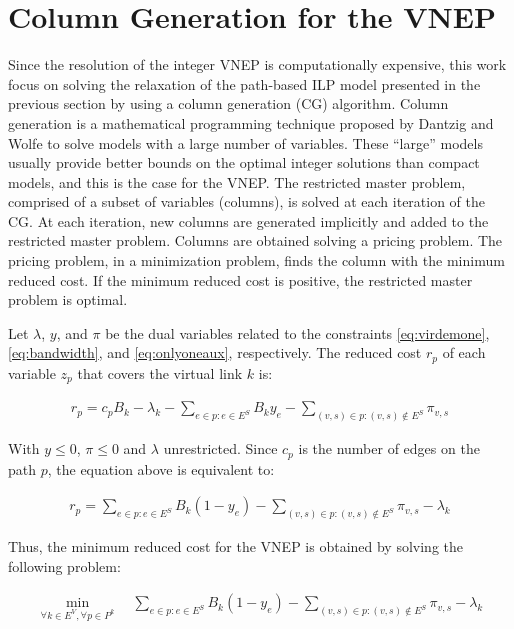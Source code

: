 \documentclass[article]{llncs}
\begin{document}
\section{Column Generation for the VNEP}
\label{sec:CG}

Since the resolution of the integer VNEP is computationally expensive, 
this work focus on solving the relaxation of the path-based ILP model presented in the previous section by using a column generation (CG) algorithm.
Column generation is a mathematical programming technique proposed by Dantzig and Wolfe \cite{Dantzig:1960} 
to solve models with a large number of variables.
These ``large'' models usually provide better bounds on the optimal integer solutions than compact models, and this is the case for the VNEP.
The restricted master problem, comprised of a subset of variables (columns), is solved at each iteration of the CG.
At each iteration, new columns are generated implicitly and added to the restricted master problem.
Columns are obtained solving a pricing problem.
The pricing problem, in a minimization problem, finds the column with the minimum reduced cost.
If the minimum reduced cost is positive, the restricted master problem is optimal.

Let $\lambda$, $y$, and  $\pi$ be the dual variables related to the constraints \eqref{eq:virdemone}, \eqref{eq:bandwidth}, and \eqref{eq:onlyoneaux}, respectively. The reduced cost $r_{p}$ of each variable $z_{p}$ that covers the virtual link $k$ is:

\begin{align}
  r_{p} = c_{p} B_{k} - \lambda_{k} - \sum\limits_{e \in p : e \in E^S} B_{k} y_{e}  - \sum\limits_{(v,s) \in p : (v,s) \notin E^S} \pi_{v,s}  \nonumber
\end{align}

With $y \leq 0$, $\pi \leq 0$ and $\lambda$ unrestricted. Since $c_p$ is the number of edges on the path $p$, the equation above is equivalent to:

\begin{align}
  r_{p} = \sum\limits_{e \in p : e \in E^S} B_{k} (1 - y_{e}) - \sum\limits_{(v,s) \in p : (v,s) \notin E^S} \pi_{v,s} - \lambda_{k} \nonumber
\end{align}

Thus, the minimum reduced cost for the VNEP is obtained by solving the following problem:

\begin{align}
  \min_{ \forall k \in E^{V}, \forall p \in P^{k}}  \quad  \sum\limits_{e \in p : e \in E^S} B_{k} (1 - y_{e}) - \sum\limits_{(v,s) \in p : (v,s) \notin E^S} \pi_{v,s}-\lambda_{k} \nonumber
\end{align}
\end{document}
